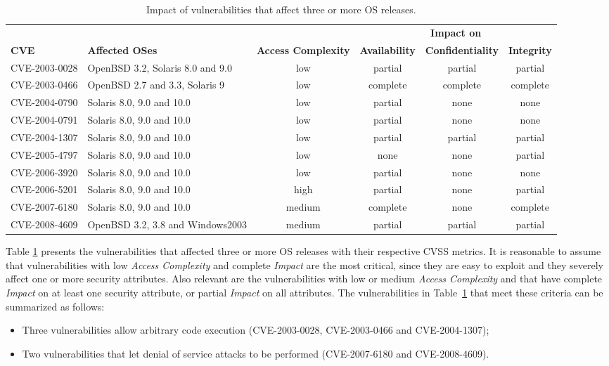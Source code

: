 \begin{table}[!ht]
\caption{Impact of vulnerabilities that affect three or more OS releases.}
\label{tab:vulns_impact}
\begin{center}
{\scriptsize
\begin{tabular}{|l|p{}|c|c|c|c|}\cline{4-6}
\multicolumn{3}{c|}{} & \multicolumn{3}{c|}{\textbf{Impact on}} \\ \cline{1-6}
\textbf{CVE} & \textbf{Affected OSes} & \textbf{Access Complexity} & \textbf{Availability} & \textbf{Confidentiality} & \textbf{Integrity} \\ \hline \hline
CVE-2003-0028 & OpenBSD 3.2, Solaris 8.0 and 9.0 & low & partial & partial & partial \\ \hline
CVE-2003-0466 & OpenBSD 2.7 and 3.3, Solaris 9 & low & complete & complete & complete \\ \hline
CVE-2004-0790 & Solaris 8.0, 9.0 and 10.0 & low & partial & none & none \\ \hline
CVE-2004-0791 & Solaris 8.0, 9.0 and 10.0 & low & partial & none & none \\ \hline
CVE-2004-1307 & Solaris 8.0, 9.0 and 10.0 & low & partial & partial & partial \\ \hline
CVE-2005-4797 & Solaris 8.0, 9.0 and 10.0 & low & none & none & partial \\ \hline
CVE-2006-3920 & Solaris 8.0, 9.0 and 10.0 & low & partial & none & none \\ \hline
CVE-2006-5201 & Solaris 8.0, 9.0 and 10.0 & high & partial & none & partial \\ \hline
CVE-2007-6180 & Solaris 8.0, 9.0 and 10.0 & medium & complete & none & complete \\ \hline
CVE-2008-4609 & OpenBSD 3.2, 3.8 and Windows2003 & medium & partial & partial & partial \\ \hline
\end{tabular}
}
\end{center}

\end{table}

Table \ref{tab:vulns_impact} presents the vulnerabilities that affected three or more OS releases with their respective CVSS metrics. It is reasonable to assume that vulnerabilities with low \emph{Access Complexity} and complete \emph{Impact} are the most critical, since they are easy to exploit and they severely affect one or more security attributes. Also relevant are the vulnerabilities with low or medium \emph{Access Complexity} and that have complete \emph{Impact} on at least one security attribute, or partial \emph{Impact} on all attributes. The vulnerabilities in Table~\ref{tab:vulns_impact} that meet these criteria can be summarized as follows:
\begin{itemize}
\item Three vulnerabilities allow arbitrary code execution (CVE-2003-0028, CVE-2003-0466 and CVE-2004-1307);
\item Two vulnerabilities that let denial of service attacks to be performed (CVE-2007-6180 and CVE-2008-4609).
\end{itemize}

